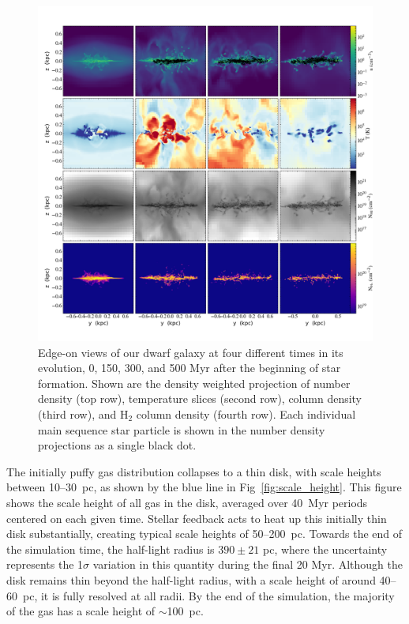 \documentclass[twocolumn]{aastex61}
\begin{document}
\begin{figure}
\centering
\includegraphics[width=0.975\linewidth]{multiplot_4x4_x.png}
\caption{Edge-on views of our dwarf galaxy at four different times in its evolution, 0, 150, 300, and 500 Myr after the beginning of star formation. Shown are the density weighted projection of number density (top row), temperature slices (second row),  column density (third row), and H$_2$ column density (fourth row). Each individual main sequence star particle is shown in the number density projections as a single black dot.}
\label{fig:panel_x}
\end{figure}

The initially puffy gas distribution collapses to a thin disk, with scale heights between 10--30~pc, as shown by the blue line in Fig~\ref{fig:scale_height}. This figure shows the scale height of all gas in the disk, averaged over 40~Myr periods centered on each given time. Stellar feedback acts to heat up this initially thin disk substantially, creating typical scale heights of 50--200~pc. Towards the end of the simulation time, the half-light radius is $390 \pm 21$ pc, where the uncertainty represents the 1$\sigma$ variation in this quantity during the final 20 Myr. Although the disk remains thin beyond the half-light radius, with a scale height of around 40--60~pc, it is fully resolved at all radii. By the end of the simulation, the majority of the gas has a scale height of $\sim$100~pc. 
\end{document}
